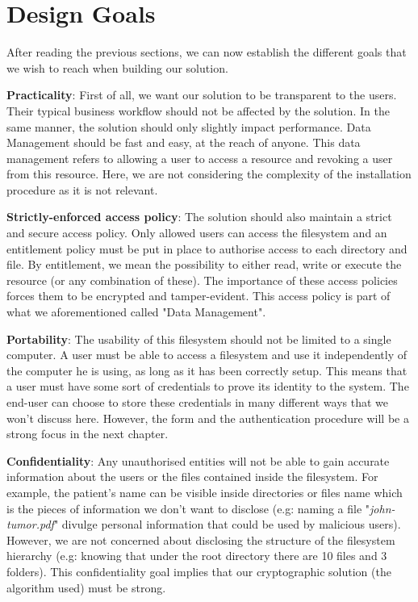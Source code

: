 \documentclass[../main.tex]{subfiles}
\begin{document}
\section{Design Goals}
\label{section:problem:design_goals}

\par After reading the previous sections, we can now establish the different goals that we wish to reach when building our solution.
\par \textbf{Practicality}: First of all, we want our solution to be transparent to the users. Their typical business workflow should not be affected by the solution. In the same manner, the solution should only slightly impact performance. Data Management should be fast and easy, at the reach of anyone.  This data management refers to allowing a user to access a resource and revoking a user from this resource. Here, we are not considering the complexity of the installation procedure as it is not relevant.
\par \textbf{Strictly-enforced access policy}: The solution should also maintain a strict and secure access policy. Only allowed users can access the filesystem and an entitlement policy must be put in place to authorise access to each directory and file. By entitlement, we mean the possibility to either read, write or execute the resource (or any combination of these). The importance of these access policies forces them to be encrypted and tamper-evident. This access policy is part of what we aforementioned called "Data Management".
\par \textbf{Portability}: The usability of this filesystem should not be limited to a single computer. A user must be able to access a filesystem and use it independently of the computer he is using, as long as it has been correctly setup. This means that a user must have some sort of credentials to prove its identity to the system. The end-user can choose to store these credentials in many different ways that we won't discuss here. However, the form and the authentication procedure will be a strong focus in the next chapter.
\par \textbf{Confidentiality}: Any unauthorised entities will not be able to gain accurate information about the users or the files contained inside the filesystem. For example, the patient's name can be visible inside directories or files name which is the pieces of information we don't want to disclose (e.g: naming a file "\textit{john-tumor.pdf}" divulge personal information that could be used by malicious users). However, we are not concerned about disclosing the structure of the filesystem hierarchy (e.g: knowing that under the root directory there are 10 files and 3 folders). This confidentiality goal implies that our cryptographic solution (the algorithm used) must be strong. 
\end{document}
